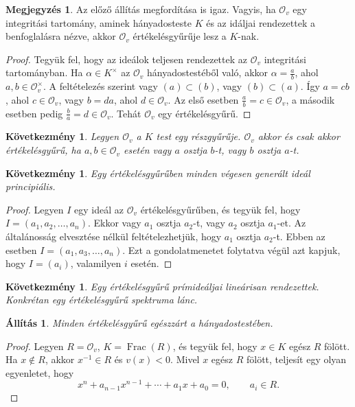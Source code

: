 \documentclass[11pt,a4paper]{article}
\newcommand{\Ov}{\mathcal{O}_v}
\theoremstyle{definition}
\newtheorem{remark}[definition]{Megjegyzés}
\theoremstyle{plain}
\newtheorem{proposition}[definition]{Állítás}
\newtheorem{corollary}[definition]{Következmény}
\begin{document}
{\begin{remark}
    Az előző állítás megfordítása is igaz. Vagyis, ha $\Ov$ egy integritási tartomány, aminek hányadosteste $K$ és az idáljai rendezettek a benfoglalásra nézve, akkor $\Ov$ értékelésgyűrűje lesz a $K$-nak.
\end{remark}
\begin{proof}
    Tegyük fel, hogy az ideálok teljesen rendezettek az $\Ov$ integritási tartományban. Ha $\alpha \in K^\times$ az $\Ov$ hányadostestéből való, akkor $\alpha = \frac{a}{b}$, ahol $a, b \in \Ov^\times$. A feltételezés szerint vagy $(a) \subset (b)$, vagy $(b) \subset (a)$. Így $a = cb$, ahol $c \in \Ov$, vagy $b = da$, ahol $d \in \Ov $. Az első esetben $\frac{a}{b} = c \in \Ov$, a második esetben pedig $\frac{b}{a} = d \in \Ov$. Tehát $\Ov$ egy értékelésgyűrű. 
\end{proof}
\begin{corollary}
    Legyen $\Ov$ a $K$ test egy részgyűrűje. $\Ov$ akkor és csak akkor értékelésgyűrű, ha
$a, b\in \Ov$ esetén vagy $a$ osztja $b$-t, vagy $b$ osztja $a$-t.
\end{corollary}
\begin{corollary}
    Egy értékelésgyűrűben minden végesen generált ideál principiális.
\end{corollary}
\begin{proof}
     Legyen $I$ egy ideál az $\Ov$ értékelésgyűrűben, és tegyük fel, hogy $I = (a_1, a_2, \dots, a_n)$. Ekkor
vagy $a_1$ osztja $a_2$-t, vagy $a_2$ osztja $a_1$-et. Az általánosság elvesztése nélkül feltételezhetjük, hogy $a_1$ osztja $a_2$-t. Ebben az esetben
$I = (a_1, a_3, …, a_n)$. Ezt a gondolatmenetet folytatva végül azt kapjuk, hogy $I = (a_i)$, valamilyen $i$ esetén. 
\end{proof}

\begin{corollary}
Egy értékelésgyűrű prímideáljai lineárisan rendezettek.
Konkrétan egy értékelésgyűrű spektruma lánc.
\end{corollary}

\begin{proposition}
Minden értékelésgyűrű egészzárt a hányadostestében.
\end{proposition}

\begin{proof}
Legyen $R=\mathcal O_v$, $K=\operatorname{Frac}(R)$, és tegyük fel,
hogy $x\in K$ egész $R$ fölött. Ha $x\notin R$, akkor
$x^{-1}\in R$ és $v(x)<0$. Mivel $x$ egész $R$ fölött,
teljesít egy olyan egyenletet, hogy
\[
x^n+a_{n-1}x^{n-1}+\cdots+a_1x+a_0=0,
\qquad
a_i\in R.
\]


\end{proof}}
\end{document}

